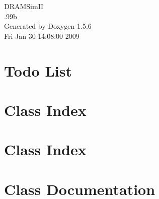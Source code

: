 \documentclass[a4paper]{book}
\begin{document}
\begin{titlepage}
\vspace*{7cm}
\begin{center}
{\Large DRAMSimII \\[1ex]\large .99b }\\
\vspace*{1cm}
{\large Generated by Doxygen 1.5.6}\\
\vspace*{0.5cm}
{\small Fri Jan 30 14:08:00 2009}\\
\end{center}
\end{titlepage}
\clearemptydoublepage
{}
\tableofcontents
\clearemptydoublepage
{}
\chapter{Todo List}
\label{todo}

\chapter{Class Index}

\chapter{Class Index}

\chapter{Class Documentation}























\printindex
\end{document}
